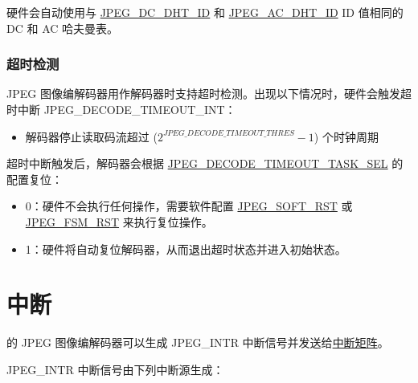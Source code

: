 \documentclass[main\_\_CN.tex]{subfiles}
\begin{document}
硬件会自动使用与 \hyperref[regdesc:JPEGDHTINFOREG]{JPEG\_DC\_DHT\_ID} 和 \hyperref[regdesc:JPEGDHTINFOREG]{JPEG\_AC\_DHT\_ID} ID 值相同的 DC 和 AC 哈夫曼表。

\subsubsection{超时检测}
\label{sec:jpegcodec-dec-timeout}
JPEG 图像编解码器用作解码器时支持超时检测。出现以下情况时，硬件会触发超时中断 JPEG\_DECODE\_TIMEOUT\_INT：
\begin{itemize}
    \item 解码器停止读取码流超过 ($ 2 ^ {\hyperref[fielddesc:JPEGDECODETIMEOUTTHRES]{JPEG\_DECODE\_TIMEOUT\_THRES}} - 1 $) 个时钟周期
\end{itemize}

超时中断触发后，解码器会根据 \hyperref[fielddesc:JPEGDECODETIMEOUTTASKSEL]{JPEG\_DECODE\_TIMEOUT\_TASK\_SEL} 的配置复位：
\begin{itemize}
    \item 0：硬件不会执行任何操作，需要软件配置 \hyperref[fielddesc:JPEGSOFTRST]{JPEG\_SOFT\_RST} 或 \hyperref[fielddesc:JPEGFSMRST]{JPEG\_FSM\_RST} 来执行复位操作。
    \item 1：硬件将自动复位解码器，从而退出超时状态并进入初始状态。
\end{itemize}


\section{中断}
\label{sec:jpegcodec-interrupts}

\chipname{} 的 JPEG 图像编解码器可以生成 JPEG\_INTR 中断信号并发送给\hyperref[mod:intmtrx]{中断矩阵}。

JPEG\_INTR 中断信号由下列中断源生成：
\end{document}
